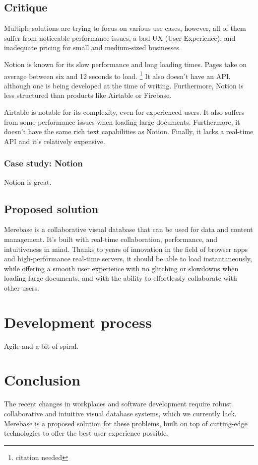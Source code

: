 \subsection{Critique}

Multiple solutions are trying to focus on various use cases, however,
all of them suffer from noticeable performance issues, a bad UX (User
Experience), and inadequate pricing for small and medium-sized
businesses.

Notion is known for its slow performance and long loading times. Pages
take on average between six and 12 seconds to load. \footnote{citation
	needed} It also doesn't have an API, although one is being developed
at the time of writing. Furthermore, Notion is less structured than
products like Airtable or Firebase.

Airtable is notable for its complexity, even for experienced users. It
also suffers from some performance issues when loading large documents.
Furthermore, it doesn't have the same rich text capabilities as Notion.
Finally, it lacks a real-time API and it's relatively expensive.

\subsubsection{Case study: Notion}

Notion is great.

\subsection{Proposed solution}

Merebase is a collaborative visual database that can be used for data
and content management. It's built with real-time collaboration,
performance, and intuitiveness in mind. Thanks to years of innovation in
the field of browser apps and high-performance real-time servers, it
should be able to load instantaneously, while offering a smooth user
experience with no glitching or slowdowns when loading large documents,
and with the ability to effortlessly collaborate with other users.

\section{Development process}

Agile and a bit of spiral.

\section{Conclusion}

The recent changes in workplaces and software development require robust
collaborative and intuitive visual database systems, which we currently
lack. Merebase is a proposed solution for these problems, built on top
of cutting-edge technologies to offer the best user experience possible.